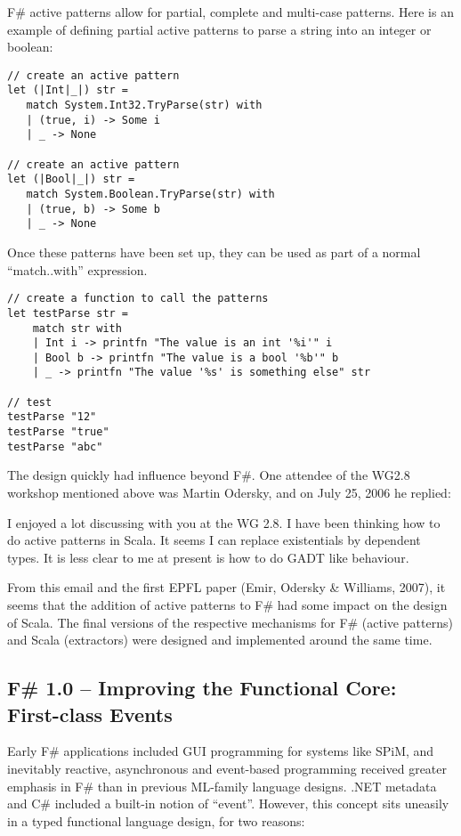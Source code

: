 \documentclass[acmsmall,review]{acmart}\settopmatter{printfolios=true,printccs=false,printacmref=false}
\begin{document}
F\# active patterns allow for partial, complete and multi-case patterns. Here is an example of defining partial active patterns to parse a string into an integer or boolean:

\begin{verbatim}
// create an active pattern
let (|Int|_|) str =
   match System.Int32.TryParse(str) with
   | (true, i) -> Some i
   | _ -> None

// create an active pattern
let (|Bool|_|) str =
   match System.Boolean.TryParse(str) with
   | (true, b) -> Some b
   | _ -> None
\end{verbatim}

Once these patterns have been set up, they can be used as part of a normal “match..with” expression.

\begin{verbatim}
// create a function to call the patterns
let testParse str = 
    match str with
    | Int i -> printfn "The value is an int '%i'" i
    | Bool b -> printfn "The value is a bool '%b'" b
    | _ -> printfn "The value '%s' is something else" str

// test
testParse "12"
testParse "true"
testParse "abc"
\end{verbatim}

The design quickly had influence beyond F\#. One attendee of the WG2.8 workshop mentioned above was Martin Odersky, and on July 25, 2006 he replied:

\begin{verbquote}
I enjoyed a lot discussing with you at the WG 2.8. I have been thinking how to do active patterns in Scala. It seems I can replace existentials by dependent types. It is less clear to me at present is how to do GADT like behaviour. 
\end{verbquote}


From this email and the first EPFL paper (Emir, Odersky \& Williams, 2007), it seems that the addition of active patterns to F\# had some impact on the design of Scala. The final versions of the respective mechanisms for F\# (active patterns) and Scala (extractors) were designed and implemented around the same time.    


\subsection*{F\# 1.0 – Improving the Functional Core: First-class Events}

Early F\# applications included GUI programming for systems like SPiM, and inevitably reactive, asynchronous and event-based programming received greater emphasis in F\# than in previous ML-family language designs. .NET metadata and C\# included a built-in notion of “event”. However, this concept sits uneasily in a typed functional language design, for two reasons:
\end{document}
